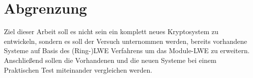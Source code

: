 \chapter{Abgrenzung}
\label{Abgrenzung}

Ziel dieser Arbeit soll es nicht sein ein komplett neues Kryptosystem zu entwickeln, sondern es soll der Versuch unternommen werden, bereits vorhandene Systeme auf Basis des (Ring-)LWE Verfahrens um das Module-LWE zu erweitern. Anschließend sollen die Vorhandenen und die neuen Systeme bei einem Praktischen Test miteinander vergleichen werden.